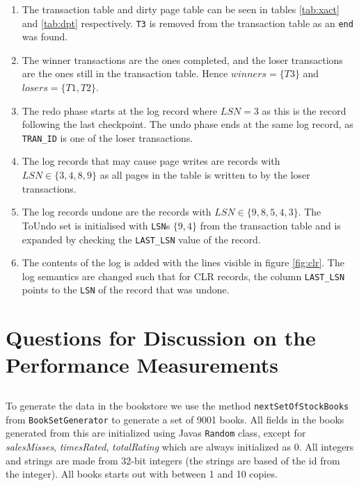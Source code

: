 \documentclass[a4paper, 11pt]{article}
\begin{document}
\begin{enumerate}
    \item The transaction table and dirty page table can be seen in tables \ref{tab:xact}
and \ref{tab:dpt} respectively. \texttt{T3} is removed from the transaction
table as an \texttt{end} was found.
    \item The winner transactions are the ones completed, and the loser transactions
are the ones still in the transaction table. Hence $winners = \{T3\}$ and $losers =
\{T1,T2\}$.
    \item The redo phase starts at the log record where $LSN=3$ as this is the
record following the last checkpoint. The undo phase ends at the same log
record, as \texttt{TRAN\_ID} is one of the loser transactions.
    \item The log records that may cause page writes are records with
    $LSN \in \{3,4,8,9\}$ as all pages in
the table is written to by the loser transactions.
    \item The log records undone are the records with $LSN \in \{9,8,5,4,3\}$. The
    ToUndo set is initialised with \texttt{LSN}s $\{9,4\}$ from the transaction table and is
    expanded by checking the \texttt{LAST\_LSN} value of the record.
    \item The contents of the log is added with the lines visible in figure
    \ref{fig:clr}. The log semantics are changed such that for CLR records, the
    column \texttt{LAST\_LSN} points to the \texttt{LSN} of the record that was undone.
\end{enumerate}




\section{Questions for Discussion on the Performance Measurements} %
\label{sec:questions_for_discussion_on_the_performance_measure_ments}

\subsection{} %

To generate the data in the bookstore we use the method \texttt{nextSetOfStockBooks} from \texttt{BookSetGenerator} to generate a set of 9001 books. All fields in the books generated from this are initialized using Javas \texttt{Random} class, except for \textit{salesMisses}, \textit{timesRated}, \textit{totalRating} which are always initialized as 0. All integers and strings are made from 32-bit integers (the strings are based of the id from the integer). All books starts out with between 1 and 10 copies.
\end{document}
